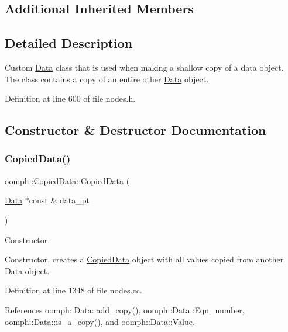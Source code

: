 \subsection*{Additional Inherited Members}


\subsection{Detailed Description}
Custom \hyperlink{classoomph_1_1Data}{Data} class that is used when making a shallow copy of a data object. The class contains a copy of an entire other \hyperlink{classoomph_1_1Data}{Data} object. 

Definition at line 600 of file nodes.\+h.



\subsection{Constructor \& Destructor Documentation}
\mbox{\label{classoomph_1_1CopiedData_ab613f17b01f372d5dbe7365cdb8b8819}} 
\subsubsection{\texorpdfstring{Copied\+Data()}{CopiedData()}\hspace{0.1cm}{\footnotesize\ttfamily [1/2]}}
{\footnotesize\ttfamily oomph\+::\+Copied\+Data\+::\+Copied\+Data (\begin{DoxyParamCaption}\item[{\hyperlink{classoomph_1_1Data}{Data} $\ast$const \&}]{data\+\_\+pt }\end{DoxyParamCaption})}



Constructor. 

Constructor, creates a \hyperlink{classoomph_1_1CopiedData}{Copied\+Data} object with all values copied from another \hyperlink{classoomph_1_1Data}{Data} object. 

Definition at line 1348 of file nodes.\+cc.



References oomph\+::\+Data\+::add\+\_\+copy(), oomph\+::\+Data\+::\+Eqn\+\_\+number, oomph\+::\+Data\+::is\+\_\+a\+\_\+copy(), and oomph\+::\+Data\+::\+Value.

